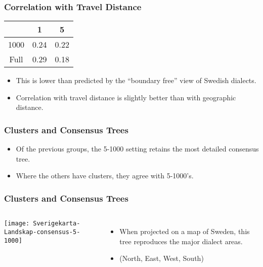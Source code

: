 \documentclass{beamer}
\begin{document}
\begin{frame}
  \frametitle{Correlation with Travel Distance}
  \begin{center}
  \begin{tabular}{c|c|c|}
  &  1 & 5 \\ \hline
  1000 & 0.24 &  0.22\\ \hline
Full & 0.29 & 0.18 \\ \hline
\end{tabular}
\end{center}
 \begin{itemize}
  \item This is lower than predicted by the ``boundary free'' view of
    Swedish dialects. %
  \item Correlation with travel distance is slightly better than with
    geographic distance.
 \end{itemize}
\end{frame}
\begin{frame}
  \frametitle{Clusters and Consensus Trees}
  \begin{itemize}
 \item Of the previous groups, the 5-1000 setting
    retains the most detailed consensus tree.
  \item Where the others have clusters, they agree with 5-1000's.
 \end{itemize}
\end{frame}

\begin{frame}
  \frametitle{Clusters and Consensus Trees}
  \begin{columns} 
    \begin{center}
      \texttt{[image: Sverigekarta-Landskap-consensus-5-1000]}
    \end{center} 
    \begin{itemize}
    \item When projected on a map of Sweden, this tree reproduces the
      major dialect areas.
    \item (North, East, West, South)
    \end{itemize}
  \end{columns}
\end{frame}
\end{document}
